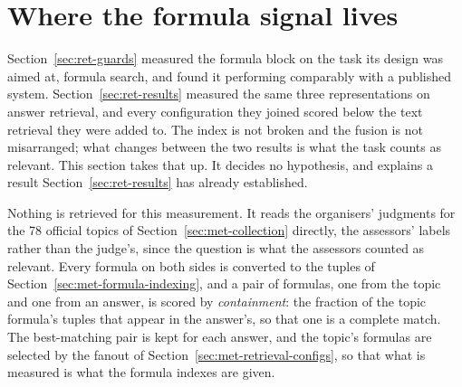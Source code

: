\section{Where the formula signal lives}\label{sec:res-transfer}

Section~\ref{sec:ret-guards} measured the formula block on the task its design was aimed at,
formula search, and found it performing comparably with a published system.
Section~\ref{sec:ret-results} measured the same three representations on answer retrieval, and
every configuration they joined scored below the text retrieval they were added to. The index
is not broken and the fusion is not misarranged; what changes between the two results is what
the task counts as relevant. This section takes that up. It decides no hypothesis, and explains
a result Section~\ref{sec:ret-results} has already established.

Nothing is retrieved for this measurement. It reads the organisers' judgments for the 78
official topics of Section~\ref{sec:met-collection} directly, the assessors' labels rather than
the judge's, since the question is what the assessors counted as relevant. Every formula on
both sides is converted to the tuples of Section~\ref{sec:met-formula-indexing}, and a pair of
formulas, one from the topic and one from an answer, is scored by \emph{containment}: the
fraction of the topic formula's tuples that appear in the answer's, so that one is a complete
match. The best-matching pair is kept for each answer, and the topic's formulas are selected by
the fanout of Section~\ref{sec:met-retrieval-configs}, so that what is measured is what the
formula indexes are given.

